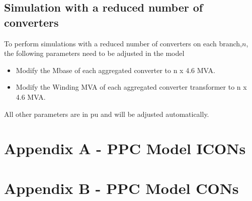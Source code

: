 \documentclass{../grid-link-report}
\newcommand{\projectassetsdir}{../project-assets}
\begin{document}
	\section{Simulation with a reduced number of converters}
	
	To perform simulations with a reduced number of converters on each branch,$n$, the following parameters need to be adjusted in the model
	
	\begin{itemize}
		\item Modify the Mbase of each aggregated converter to n x 4.6 MVA.
		\item Modify the Winding MVA of each aggregated converter transformer to n x 4.6 MVA.
		
	\end{itemize}
	
	All other parameters are in pu and will be adjusted automatically.
	
	

	\chapter{Appendix A - PPC Model ICONs}
	

	
	\chapter{Appendix B - PPC Model CONs}
    
\end{document}
